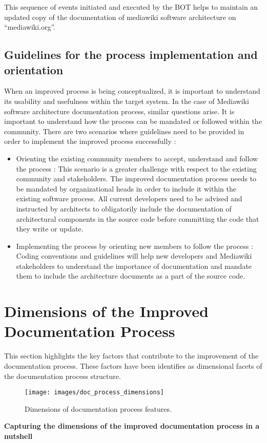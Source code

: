 This sequence of events initiated and executed by the BOT helps to maintain an updated copy of the documentation of mediawiki software architecture on \enquote{mediawiki.org}.  

\subsection{Guidelines for the process implementation and orientation}
When an improved process is being conceptualized, it is important to understand its usability and usefulness within the target system. In the case of Mediawiki software architecture documentation process, similar questions arise. It is important to understand how the process can be mandated or followed within the community.
\indent There are two scenarios where guidelines need to be provided in order to implement the improved process successfully \cite{Employee} :
\begin{itemize}
\item Orienting the existing community members to accept, understand and follow the process : 
\newline This scenario is a greater challenge with respect to the existing community and stakeholders. The improved documentation process needs to be mandated by organizational heads in order to include it within the existing software process. All current developers need to be advised and instructed by architects to obligatorily include the documentation of architectural components in the source code before committing the code that they write or update. 
\item Implementing the process by orienting new members to follow the process :
\newline Coding conventions and guidelines will help new developers and Mediawiki stakeholders to understand the importance of documentation and mandate them to include the architecture documents as a part of the source code.
\end{itemize}





\section{Dimensions of the Improved Documentation Process} \label{PorcDimension}
\indent This section highlights the key factors that contribute to the improvement of the documentation process. These factors have been identifies as dimensional facets of the documentation process structure. 
\begin{figure}[H]
  \centering
  \texttt{[image: images/doc\_process\_dimensions]}
  \caption[Dimensions of documentation process features]{Dimensions of documentation process features.}\label{fig:doc_process_dimensions}
\end{figure}
\textbf{Capturing the dimensions of the improved documentation process in a nutshell} 

